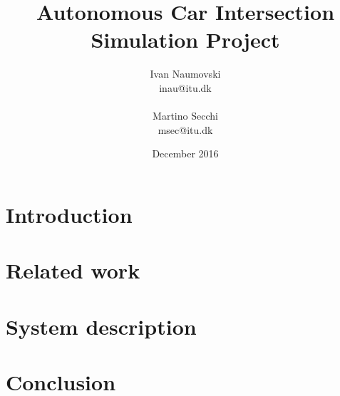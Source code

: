 \documentclass{article}
\begin{document}
\title{Autonomous Car Intersection Simulation Project}

\author{
   Ivan Naumovski\\
    {inau@itu.dk}\\
    \\
   Martino Secchi\\
    {msec@itu.dk}\\
}
\date{December 2016}

\maketitle
\clearpage
\tableofcontents
\clearpage


\abstract{

}
\section{Introduction}


\section{Related work}


\section{System description}


\section{Conclusion}




\end{document}
